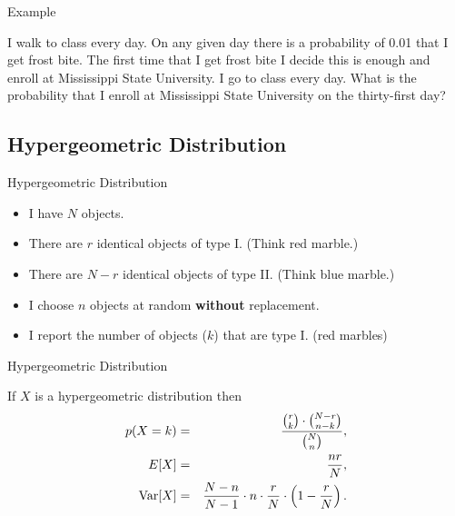 \begin{frame}{Example}

  I walk to class every day. On any given day there is a probability
  of 0.01 that I get frost bite. The first time that I get frost bite
  I decide this is enough and enroll at Mississippi State
  University. I go to class every day. What is the probability that I
  enroll at Mississippi State University on the thirty-first day?

\end{frame}

\subsection{Hypergeometric Distribution}

\begin{frame}{Hypergeometric Distribution}

  \begin{itemize}
  \item I have $N$ objects.
  \item There are $r$ identical objects of type I. (Think red marble.)
  \item There are $N-r$ identical objects of type II. (Think blue  marble.)
  \item I choose $n$ objects at random \textbf{without} replacement.
  \item I report the number of objects ($k$) that are type I. (red marbles)
  \end{itemize}

  \vfill


\end{frame}

\begin{frame}{Hypergeometric Distribution}


  \begin{definition}
    If $X$ is a hypergeometric distribution then
    \begin{eqnarray*}
      p(X=k) & = & \frac{{r \choose k}\cdot{{N-r}\choose{n-k}}}{{N \choose n}}, \\
      E[X] & = & \frac{nr}{N}, \\
      \mathrm{Var}[X] & = & \frac{N-n}{N-1} \cdot n \cdot \frac{r}{N} \cdot \left( 1-\frac{r}{N}\right).
    \end{eqnarray*}
  \end{definition}

\end{frame}

